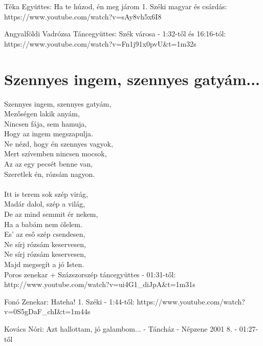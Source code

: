 Téka Együttes: Ha te húzod, én meg járom 1. Széki magyar és csárdás:
https://www.youtube.com/watch?v=sAy8vh5x6I8

Angyalföldi Vadrózsa Táncegyüttes: Szék városa - 1:32-től és 16:16-tól:
https://www.youtube.com/watch?v=Fn1j91x0pvU\&t=1m32s

\section{Szennyes ingem, szennyes gatyám...}
Szennyes ingem, szennyes gatyám,\\
Mezőségen lakik anyám,\\
Nincsen fája, sem hamuja,\\
Hogy az ingem megszapulja.\\
Ne nézd, hogy én szennyes vagyok,\\
Mert szívemben nincsen mocsok,\\
Az az egy pecsét benne van,\\
Szeretlek én, rózsám nagyon.\\\\
Itt is terem sok szép virág,\\
Madár dalol, szép a világ,\\
De az mind semmit ér nekem,\\
Ha a babám nem ölelem.\\
Es' az eső szép csendesen,\\
Ne sírj rózsám keservesen,\\
Ne sírj rózsám keservesen,\\
Majd megsegít a jó Isten.\\

Poros zenekar + Százszorszép táncegyüttes - 01:31-től:
http://www.youtube.com/watch?v=ui4G1\_diJpA\&t=1m31s

Fonó Zenekar: Hateha! 1. Széki - 1:44-től:
https://www.youtube.com/watch?v=0S5gDaF\_chI\&t=1m44s

Kovács Nóri: Azt hallottam, jó galambom... - Táncház - Népzene 2001 8. - 01:27-től

